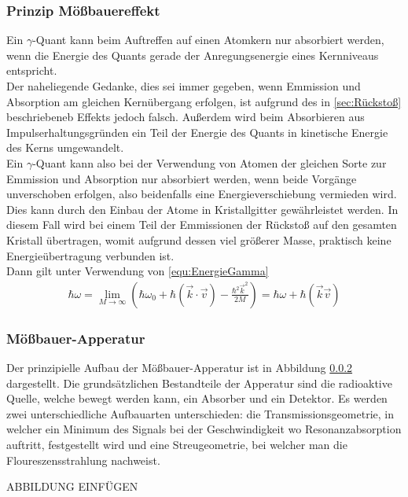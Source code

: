 \documentclass[a4paper,twoside,final]{article}
\begin{document}
\subsubsection{Prinzip Mößbauereffekt}
Ein $\gamma$-Quant kann beim Auftreffen auf einen Atomkern nur absorbiert werden, wenn die Energie des Quants gerade der Anregungsenergie eines Kernniveaus entspricht. \\

Der naheliegende Gedanke, dies sei immer gegeben, wenn Emmission und Absorption am gleichen Kernübergang erfolgen, ist aufgrund des in \ref{sec:Rückstoß} beschriebeneb Effekts jedoch falsch. Außerdem wird beim Absorbieren aus Impulserhaltungsgründen ein Teil der Energie des Quants in kinetische Energie des Kerns umgewandelt. \\

Ein $\gamma$-Quant kann also bei der Verwendung von Atomen der gleichen Sorte zur Emmission und Absorption nur absorbiert werden, wenn beide Vorgänge unverschoben erfolgen, also beidenfalls eine Energieverschiebung vermieden wird. Dies kann durch den Einbau der Atome in Kristallgitter gewährleistet werden. In diesem Fall wird bei einem Teil der Emmissionen der Rückstoß auf den gesamten Kristall übertragen, womit aufgrund dessen viel größerer Masse, praktisch keine Energieübertragung verbunden ist.\\
Dann gilt unter Verwendung von \ref{equ:EnergieGamma}
\begin{align}
\hbar\omega = \lim\limits_{M \to \infty}{(\hbar \omega_0 + \hbar (\vec{k}\cdot\vec{v})-\frac{\hbar^2\vec{k}^2}{2M})} = \hbar\omega+\hbar(\vec{k}\vec{v})
\end{align}

\subsubsection{Mößbauer-Apperatur}
Der prinzipielle Aufbau der Mößbauer-Apperatur ist in Abbildung \ref{} dargestellt. Die grundsätzlichen Bestandteile der Apperatur sind die radioaktive Quelle, welche bewegt werden kann, ein Absorber und ein Detektor. Es werden zwei unterschiedliche Aufbauarten unterschieden: die Transmissionsgeometrie, in welcher ein Minimum des Signals bei der Geschwindigkeit wo Resonanzabsorption auftritt, festgestellt wird und eine Streugeometrie, bei welcher man die Floureszensstrahlung nachweist.

ABBILDUNG EINFÜGEN
\end{document}
